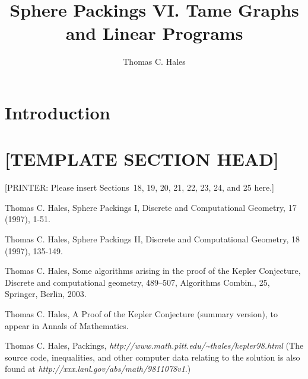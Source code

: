 \documentclass[11pt]{amsart}
\title{Sphere Packings VI. Tame Graphs and Linear Programs}
\author{Thomas C. Hales}
\begin{document}
\begin{abstract}

\end{abstract}

\maketitle

\section*{Introduction}





\section*{[TEMPLATE SECTION HEAD]}

[PRINTER: Please insert Sections~18, 19, 20, 21, 22, 23, 24, and 25
here.]





\begin{thebibliography}{Hal97b}

 Thomas C. Hales, Sphere Packings I,
    Discrete and Computational Geometry, 17 (1997), 1-51.

 Thomas C. Hales, Sphere Packings II,
    Discrete and Computational Geometry, 18 (1997), 135-149.

 Thomas C. Hales, Some algorithms arising in
the proof of the Kepler Conjecture,
 Discrete and computational geometry,
 489--507, Algorithms Combin., 25, Springer, Berlin, 2003.

 Thomas C. Hales, A Proof of the
Kepler Conjecture (summary version), to appear in Annals of
Mathematics.

 Thomas C. Hales, Packings, \hfill\break
    \hfill{\it http://www.math.pitt.edu/\~%
    \relax thales/kepler98.html} \hfil\break
     (The source code, inequalities,
    and other computer data relating to the solution is also found
    at {\it http://xxx.lanl.gov/abs/math/9811078v1}.)


\end{thebibliography}
\end{document}
